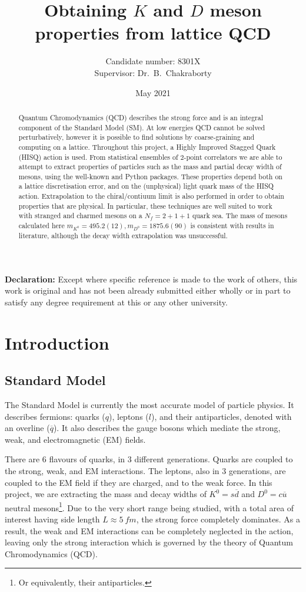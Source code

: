 \documentclass[a4paper,12pt]{article}
\title{Obtaining $K$ and $D$ meson properties from lattice QCD}
\author{Candidate number: 8301X \\ Supervisor: Dr.\ B.\ Chakraborty}
\date{May 2021}
\begin{document}
\maketitle
\begin{abstract}
    Quantum Chromodynamics (QCD) describes the strong force and is an integral component of the Standard Model (SM). At low energies QCD cannot be solved perturbatively, however it is possible to find solutions by coarse-graining and computing on a lattice. Throughout this project, a Highly Improved Stagged Quark (HISQ) action is used. From statistical ensembles of 2-point correlators we are able to attempt to extract properties of particles such as the mass and partial decay width of mesons, using the well-known  and  Python packages. These properties depend both on a lattice discretisation error, and on the (unphysical) light quark mass of the HISQ action. Extrapolation to the chiral/contiuum limit is also performed in order to obtain properties that are physical. In particular, these techniques are well suited to work with stranged and charmed mesons on a $N_f = 2 + 1 + 1$ quark sea. The mass of mesons calculated here $m_{K^0}=495.2(12), m_{D^0}=1875.6(90)$ is consistent with results in literature, although the decay width extrapolation was unsuccessful.
\end{abstract} 

\textbf{Declaration:} Except where specific reference is made to the work of others, this work is original and has not been already submitted either wholly or in part to satisfy any degree requirement at this or any other university.

\pagebreak
\tableofcontents
\pagebreak

\section{Introduction}
\subsection{Standard Model}
The Standard Model is currently the most accurate model of particle physics. It describes fermions: quarks ($q$), leptons ($l$), and their antiparticles, denoted with an overline ($\overline{q}$). It also describes the gauge bosons which mediate the strong, weak, and electromagnetic (EM) fields. 

There are 6 flavours of quarks, in 3 different generations. Quarks are coupled to the strong, weak, and EM interactions. The leptons, also in 3 generations, are coupled to the EM field if they are charged, and to the weak force. In this project, we are extracting the mass and decay widths of $K^0=s \overline{d}$ and $D^0= c \overline{u}$ neutral mesons\footnote{Or equivalently, their antiparticles.}. Due to the very short range being studied, with a total area of interest having side length $L \approx \SI{5}{fm}$, the strong force completely dominates. As a result, the weak and EM interactions can be completely neglected in the action, leaving only the strong interaction which is governed by the theory of Quantum Chromodynamics (QCD).
\end{document}
